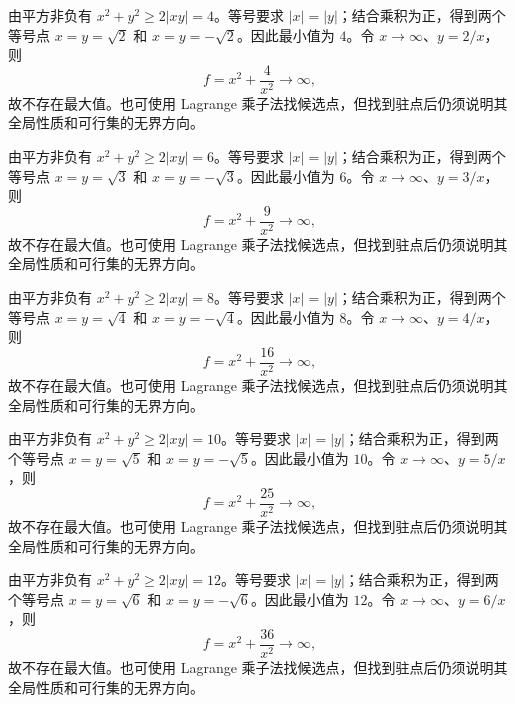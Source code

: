 \documentclass[UTF8,12pt,a4paper,fontset=fandol]{ctexart}
\begin{document}
\begin{solve}\label{ans:c34q21}
由平方非负有 $x^2+y^2\ge2|xy|=4$。等号要求 $|x|=|y|$；结合乘积为正，得到两个等号点 $x=y=\sqrt{2}$ 和 $x=y=-\sqrt{2}$。因此最小值为 $4$。令 $x\to\infty$、$y=2/x$，则
\[
f=x^2+\frac{4}{x^2}\to\infty,
\]
故不存在最大值。也可使用 Lagrange 乘子法找候选点，但找到驻点后仍须说明其全局性质和可行集的无界方向。
\end{solve}

\begin{solve}\label{ans:c34q22}
由平方非负有 $x^2+y^2\ge2|xy|=6$。等号要求 $|x|=|y|$；结合乘积为正，得到两个等号点 $x=y=\sqrt{3}$ 和 $x=y=-\sqrt{3}$。因此最小值为 $6$。令 $x\to\infty$、$y=3/x$，则
\[
f=x^2+\frac{9}{x^2}\to\infty,
\]
故不存在最大值。也可使用 Lagrange 乘子法找候选点，但找到驻点后仍须说明其全局性质和可行集的无界方向。
\end{solve}

\begin{solve}\label{ans:c34q23}
由平方非负有 $x^2+y^2\ge2|xy|=8$。等号要求 $|x|=|y|$；结合乘积为正，得到两个等号点 $x=y=\sqrt{4}$ 和 $x=y=-\sqrt{4}$。因此最小值为 $8$。令 $x\to\infty$、$y=4/x$，则
\[
f=x^2+\frac{16}{x^2}\to\infty,
\]
故不存在最大值。也可使用 Lagrange 乘子法找候选点，但找到驻点后仍须说明其全局性质和可行集的无界方向。
\end{solve}

\begin{solve}\label{ans:c34q24}
由平方非负有 $x^2+y^2\ge2|xy|=10$。等号要求 $|x|=|y|$；结合乘积为正，得到两个等号点 $x=y=\sqrt{5}$ 和 $x=y=-\sqrt{5}$。因此最小值为 $10$。令 $x\to\infty$、$y=5/x$，则
\[
f=x^2+\frac{25}{x^2}\to\infty,
\]
故不存在最大值。也可使用 Lagrange 乘子法找候选点，但找到驻点后仍须说明其全局性质和可行集的无界方向。
\end{solve}

\begin{solve}\label{ans:c34q25}
由平方非负有 $x^2+y^2\ge2|xy|=12$。等号要求 $|x|=|y|$；结合乘积为正，得到两个等号点 $x=y=\sqrt{6}$ 和 $x=y=-\sqrt{6}$。因此最小值为 $12$。令 $x\to\infty$、$y=6/x$，则
\[
f=x^2+\frac{36}{x^2}\to\infty,
\]
故不存在最大值。也可使用 Lagrange 乘子法找候选点，但找到驻点后仍须说明其全局性质和可行集的无界方向。
\end{solve}
\end{document}
